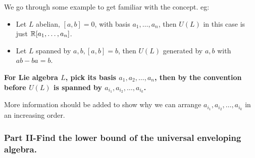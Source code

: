 \documentclass[11pt]{article}
\begin{document}
We go through some example to get familiar with the concept.
eg:
\begin{itemize}
\item Let \(L\) abelian, \([a,b] = 0\), with basis \(a_1,\dots,a_n\), then \(U(L)\) in this case is just \(\mathbb{R}[a_1,\dots,a_n]\).
\item Let \(L\) spanned by \(a,b, [a,b] = b\), then \(U(L)\) generated by \(a,b\) with \(ab - ba = b\).
\end{itemize}


\textbf{For Lie algebra \(L\), pick its basis \(a_1, a_2, \dots, a_n\), then by the convention before \(U(L)\) is spanned by \(a_{i_1}, a_{i_2}, \dots, a_{i_k}\).}

More information should be added to show why we can arrange \(a_{i_1}, a_{i_2}, \dots, a_{i_k}\) in an increasing order.
\subsubsection{Part II-Find the lower bound of the universal enveloping algebra.}
\label{sec:org52643ab}
\end{document}
